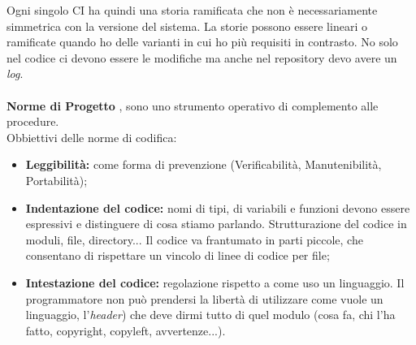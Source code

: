 Ogni singolo CI ha quindi una storia ramificata che non è necessariamente simmetrica con la versione del sistema. La storie possono essere lineari o ramificate quando ho delle varianti in cui ho più requisiti in contrasto. No solo nel codice ci devono essere le modifiche ma anche nel repository devo avere un \textit{log}.\\
\\

\textbf{Norme di Progetto} , sono uno strumento operativo di complemento alle procedure.\\
Obbiettivi delle norme di codifica:

\begin{itemize}
	\item \textbf{Leggibilità:} come forma di prevenzione (Verificabilità, Manutenibilità, Portabilità);
	\item \textbf{Indentazione del codice:} nomi di tipi, di variabili e funzioni devono essere espressivi e distinguere di cosa stiamo parlando. Strutturazione del codice in moduli, file, directory... Il codice va frantumato in parti piccole, che consentano di rispettare un vincolo di linee di codice per file;
	\item \textbf{Intestazione del codice:} regolazione rispetto a come uso un linguaggio. Il programmatore non può prendersi la libertà di utilizzare come vuole un linguaggio, l'\textit{header}) che deve dirmi tutto di quel modulo (cosa fa, chi l'ha fatto, copyright, copyleft, avvertenze...).

\end{itemize}

